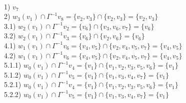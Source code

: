 \documentclass{article}
\begin{document}
\\
\hspace*{12mm} 1) $v_7$
\\
\hspace*{12mm} 2) $w_3(v_1) \cap \Gamma^{-1} v_8 =  \{v_2, v_3\} \cap \{v_2, v_3\} = \{v_2, v_3\}$
\\
\hspace*{12mm} 3.1) $w_2(v_1) \cap \Gamma^{-1} v_2 =  \{v_6\} \cap \{v_3, v_6, v_7\} = \{v_6\}$
\\
\hspace*{12mm} 3.2) $w_2(v_1) \cap \Gamma^{-1} v_3 =  \{v_6\} \cap \{v_2, v_6\} = \{v_6\}$
\\
\hspace*{12mm} 4.1) $w_1(v_1) \cap \Gamma^{-1} v_6 =  \{v_4, v_5\} \cap \{v_2, v_4, v_5, v_7\} = \{v_4, v_5\}$
\\
\hspace*{12mm} 4.2) $w_1(v_1) \cap \Gamma^{-1} v_6 =  \{v_4, v_5\} \cap \{v_2, v_4, v_5, v_7\} = \{v_4, v_5\}$
\\
\hspace*{12mm} 5.1.1) $w_0(v_1) \cap \Gamma^{-1} v_4 =  \{v_1\} \cap \{v_1, v_2, v_3, v_5, v_6\} = \{v_1\}$
\\
\hspace*{12mm} 5.1.2) $w_0(v_1) \cap \Gamma^{-1} v_5 =  \{v_1\} \cap \{v_1, v_3, v_4, v_7\} = \{v_1\}$
\\
\hspace*{12mm} 5.2.1) $w_0(v_1) \cap \Gamma^{-1} v_4 =  \{v_1\} \cap \{v_1, v_2, v_3, v_5, v_6\} = \{v_1\}$
\\
\hspace*{12mm} 5.2.2) $w_0(v_1) \cap \Gamma^{-1} v_5 =  \{v_1\} \cap \{v_1, v_3, v_4, v_7\} = \{v_1\}$\\\\
\end{document}
